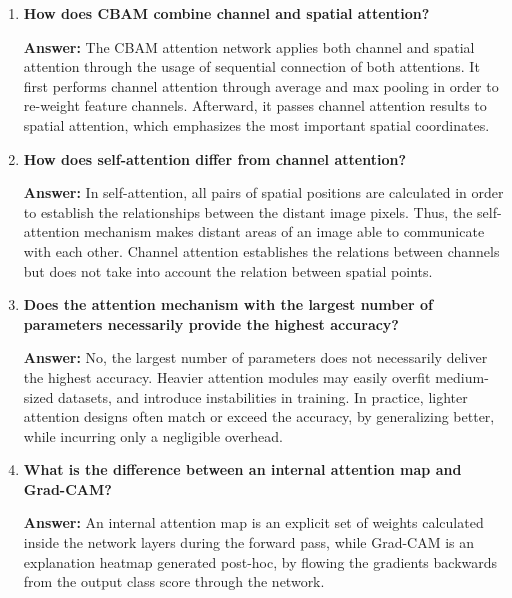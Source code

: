 \documentclass[10pt]{article}
\begin{document}
\begin{enumerate}
\vspace{5mm}

\item \textbf{How does CBAM combine channel and spatial attention?}

\textbf{Answer:} The CBAM attention network applies both channel and spatial attention through the usage of sequential connection of both attentions. It first performs channel attention through average and max pooling in order to re-weight feature channels. Afterward, it passes channel attention results to spatial attention, which emphasizes the most important spatial coordinates.

\vspace{5mm}

\item \textbf{How does self-attention differ from channel attention?}

\textbf{Answer:} In self-attention, all pairs of spatial positions are calculated in order to establish the relationships between the distant image pixels. Thus, the self-attention mechanism makes distant areas of an image able to communicate with each other. Channel attention establishes the relations between channels but does not take into account the relation between spatial points.

\vspace{5mm}

\item \textbf{Does the attention mechanism with the largest number of parameters
necessarily provide the highest accuracy?}

\textbf{Answer:} No, the largest number of parameters does not necessarily deliver the highest accuracy. Heavier attention modules may easily overfit medium-sized datasets, and introduce instabilities in training. In practice, lighter attention designs often match or exceed the accuracy, by generalizing better, while incurring only a negligible overhead.

\vspace{5mm}

\item \textbf{What is the difference between an internal attention map and Grad-CAM?}

\textbf{Answer:} An internal attention map is an explicit set of weights calculated inside the network layers during the forward pass, while Grad-CAM is an explanation heatmap generated post-hoc, by flowing the gradients backwards from the output class score through the network.


\end{enumerate}
\end{document}
